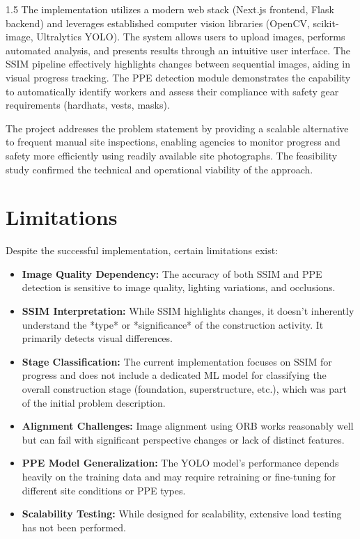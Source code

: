 \documentclass[12pt,a4paper]{report}
\begin{document}
\begin{spacing}{1.5}
    The implementation utilizes a modern web stack (Next.js frontend, Flask backend) and leverages established computer vision libraries (OpenCV, scikit-image, Ultralytics YOLO). The system allows users to upload images, performs automated analysis, and presents results through an intuitive user interface. The SSIM pipeline effectively highlights changes between sequential images, aiding in visual progress tracking. The PPE detection module demonstrates the capability to automatically identify workers and assess their compliance with safety gear requirements (hardhats, vests, masks).

    The project addresses the problem statement by providing a scalable alternative to frequent manual site inspections, enabling agencies to monitor progress and safety more efficiently using readily available site photographs. The feasibility study confirmed the technical and operational viability of the approach.

    \section{Limitations}
    Despite the successful implementation, certain limitations exist:
    \begin{itemize}
        \item \textbf{Image Quality Dependency:} The accuracy of both SSIM and PPE detection is sensitive to image quality, lighting variations, and occlusions.
        \item \textbf{SSIM Interpretation:} While SSIM highlights changes, it doesn't inherently understand the *type* or *significance* of the construction activity. It primarily detects visual differences.
        \item \textbf{Stage Classification:} The current implementation focuses on SSIM for progress and does not include a dedicated ML model for classifying the overall construction stage (foundation, superstructure, etc.), which was part of the initial problem description.
        \item \textbf{Alignment Challenges:} Image alignment using ORB works reasonably well but can fail with significant perspective changes or lack of distinct features.
        \item \textbf{PPE Model Generalization:} The YOLO model's performance depends heavily on the training data and may require retraining or fine-tuning for different site conditions or PPE types.
        \item \textbf{Scalability Testing:} While designed for scalability, extensive load testing has not been performed.
    \end{itemize}


\end{spacing}
\end{document}
